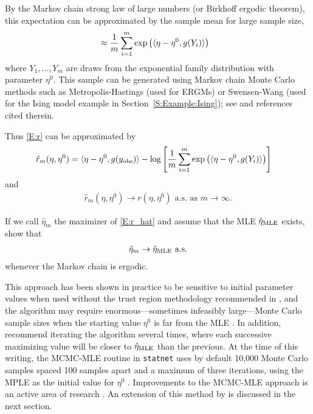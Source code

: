 By the Markov chain strong law of large numbers (or Birkhoff ergodic theorem), this 
expectation can be approximated by the sample mean for large sample size,
\begin{align*}
	&\approx \frac{1}{m} \sum_{i=1}^{m}\exp \left ( \langle  \eta - \eta^0,g(Y_i) \rangle \right )
\end{align*}
where $Y_1, \ldots, Y_m$ are draws from the exponential family distribution with 
parameter $\eta^0$.  This sample can be generated using Markov chain Monte Carlo 
methods such as Metropolis-Hastings (used for ERGMs) or Swensen-Wang (used for the Ising model example in Section~\ref{S:Example:Ising}); see 
\citep{Brooks} and references cited therein.

Thus \eqref{E:r} can be approximated by
\begin{align}
\hat{r}_m( \eta, \eta^0 ) &= \langle  \eta - \eta^0, g(y_{\text{obs}}) \rangle - \log 
	\left [ \frac{1}{m} \sum_{i=1}^{m} \exp \left ( \langle  \eta - \eta^0, g(Y_i) \rangle \right ) \right ] 
	\label{E:r_hat}
\end{align}
and 
\begin{align*}
	\hat{r}_m( \eta, \eta^0 ) \to r( \eta, \eta^0 ) \text{ a.s. as $m \to \infty$}.
\end{align*}

If we call $\hat{\eta}_m$  the maximizer of \eqref{E:r_hat} and assume that the MLE 
$\hat{\eta}_{\textrm{MLE}}$ exists, \citeauthor{Geyer:1992} show that 
\begin{align*}
	\hat{\eta}_m \to \hat{\eta}_{\textrm{MLE}} \text{ a.s.}
\end{align*}
 whenever the Markov chain is ergodic. 
 
This approach has been shown in practice to be sensitive to initial parameter 
values when used without the trust region methodology recommended in \citep{Geyer:1992}, 
and the algorithm may require enormous---sometimes infeasibly large---Monte Carlo sample sizes 
when the starting value $\eta^0$ is far from the MLE \citep{ergm}.  
In addition, \citeauthor{Geyer:1992} recommend iterating the algorithm several times, 
where each successive maximizing value will be closer to $\hat{\eta}_{\textrm{MLE}}$ than the previous.  At the 
time of this writing, the MCMC-MLE routine in \texttt{statnet} uses by default 10,000 
Monte Carlo samples spaced 100 samples apart and a maximum of three iterations, using the 
MPLE as the initial value for $\eta^0$ \citep{statnet:R}.  
Improvements to the MCMC-MLE approach is an active area of research \citep*{Bartz}.
An extension of this method by \citet{Hummel} is discussed in the next section.

